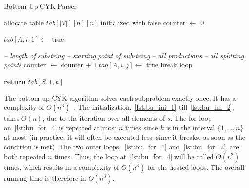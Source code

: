 \begin{algorithm}[H]
    \caption{Bottom-Up CYK Parser}
    \label{alg:bu}
    \begin{algorithmic}[1]
        \State allocate table $tab[|V|][n][n]$ initialized with false
        \State counter $\leftarrow$ 0 \label{lst:bu_ini_1}
    
                \State $tab[A,i,1] \leftarrow$ true
            \EndFor
        \EndFor \label{lst:bu_ini_2}

         \hspace*{2.75cm}\textit{-- length of substring} \label{lst:bu_for_1}
             \hspace*{1cm}\textit{-- starting point of substring} \label{lst:bu_for_2}
                 \hspace*{1cm}\textit{-- all productions} \label{lst:bu_for_3}
                     \hspace*{0.5cm}\textit{-- all splitting points} \label{lst:bu_for_4}
                        \State counter $\leftarrow$ counter + 1
                            \State $tab[A,i,j]\leftarrow$ true
                            \State break loop
                        \EndIf
                    \EndFor
                \EndFor
            \EndFor
        \EndFor

        \State \textbf{return} $tab[S,1,n]$
        \EndFunction
    \end{algorithmic}
\end{algorithm}

The bottom-up CYK algorithm solves each subproblem exactly once.
It has a complexity of $O(n^3)$~\cite{automata}.
The initialization,~\cref{lst:bu_ini_1} till~\cref{lst:bu_ini_2}, takes $O(n)$, due to the iteration over all elements of $s$.
The for-loop on~\cref{lst:bu_for_4} is repeated at most $n$ times since $k$ is in the interval $\{1,\dots,n\}$ at most (in practice, it will often be executed less, since it breaks, as soon as the condition is met).
The two outer loops,~\cref{lst:bu_for_1} and~\cref{lst:bu_for_2}, are both repeated $n$ times.
Thus, the loop at~\cref{lst:bu_for_4} will be called $O(n^2)$ times, which results in a complexity of $O(n^3)$ for the nested loops.
The overall running time is therefore in $O(n^3)$.

